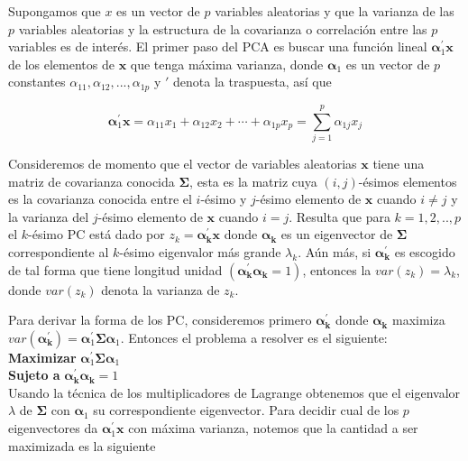Supongamos que $x$ es un vector de $p$ variables aleatorias y que la varianza de las $p$ variables aleatorias y la estructura de la covarianza o correlación entre las $p$ variables es de interés. El primer paso del PCA es buscar una función lineal $\boldsymbol{\alpha}_1^\prime \boldsymbol{x}$ de los elementos de $\boldsymbol{x}$ que tenga máxima varianza, donde $\boldsymbol{\alpha}_{1}$ es un vector de $p$ constantes $\alpha_{11},\alpha_{12},...,\alpha_{1p}$ y $\prime$ denota la traspuesta, así que

\[
\boldsymbol{\alpha}_{1}^{\prime} \boldsymbol{x}=\alpha_{11} x_{1}+\alpha_{12} x_{2}+\cdots+\alpha_{1 p} x_{p}=\sum_{j=1}^{p} \alpha_{1 j} x_{j}
\] 

Consideremos de momento que el vector de variables aleatorias $\boldsymbol{x}$ tiene una matriz de covarianza conocida $\boldsymbol{\Sigma}$, esta es la matriz cuya $(i,j)$-ésimos elementos es la covarianza conocida entre el $i$-ésimo y $j$-ésimo elemento de $\boldsymbol{x}$ cuando $i \neq j$ y la varianza del $j$-ésimo elemento de $\boldsymbol{x}$ cuando $i = j$. Resulta que para $k=1,2,..,p$ el $k$-ésimo PC está dado por $z_k = \boldsymbol{\alpha_k^\prime} \boldsymbol{x}$ donde $\boldsymbol{\alpha_k}$ es un eigenvector de $\boldsymbol{\Sigma}$ correspondiente al $k$-ésimo eigenvalor más grande $\lambda_k$. Aún más, si $\boldsymbol{\alpha_k^\prime}$ es escogido de tal forma que tiene longitud unidad $(\boldsymbol{\alpha_k^\prime}\boldsymbol{\alpha_k}=1)$, entonces la $var(z_k)=\lambda_k$, donde $var(z_k)$ denota la varianza de $z_k$.

Para derivar la forma de los PC, consideremos primero $\boldsymbol{\alpha_k^\prime}$ donde $\boldsymbol{\alpha_k}$ maximiza $var(\boldsymbol{\alpha_k^\prime})= \boldsymbol{\alpha}_{1}^{\prime} \boldsymbol{\Sigma} \boldsymbol{\alpha}_{1}$. Entonces el problema a resolver es el siguiente:\\

\textbf{Maximizar} $\boldsymbol{\alpha}_{1}^{\prime} \boldsymbol{\Sigma} \boldsymbol{\alpha}_{1}$\\

\textbf{Sujeto a} $\boldsymbol{\alpha_k^\prime}\boldsymbol{\alpha_k}=1$\\

Usando la técnica de los multiplicadores de Lagrange obtenemos que el eigenvalor $\lambda$ de $\boldsymbol{\Sigma}$ con $\boldsymbol{\alpha}_{1}$ su correspondiente eigenvector. Para decidir cual de los $p$ eigenvectores da $\boldsymbol{\alpha}_{1}^{\prime}\boldsymbol{x}$ con máxima varianza, notemos que la cantidad a ser maximizada es la siguiente

